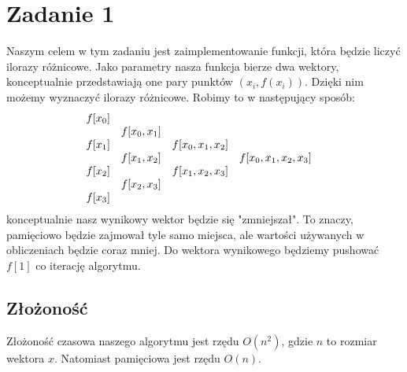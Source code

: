 \documentclass{article}
\begin{document}

\section*{Zadanie 1}
Naszym celem w tym zadaniu jest zaimplementowanie funkcji, która będzie liczyć
ilorazy różnicowe.
Jako parametry nasza funkcja bierze dwa wektory, konceptualnie przedstawiają
one pary punktów $(x_i, f(x_i))$. Dzięki nim możemy wyznaczyć ilorazy różnicowe.
Robimy to w następujący sposób:
\[
\begin{array}[t]{ccccc}
f[x_0] & & & & \\
& f[x_0, x_1] & & & \\
f[x_1] & & f[x_0, x_1, x_2] & & \\
& f[x_1, x_2] & & f[x_0, x_1, x_2, x_3] & \\
f[x_2] & & f[x_1, x_2, x_3] & & \\
& f[x_2, x_3] & & & \\
f[x_3] & & & & \\
\end{array}
\]
konceptualnie nasz wynikowy wektor będzie się "zmniejszał".
To znaczy, pamięciowo będzie zajmował tyle samo miejsca, ale
wartości używanych w obliczeniach będzie coraz mniej. Do wektora
wynikowego będziemy pushować $f[1]$ co iterację algorytmu.
\begin{algorithm}[h]
    \SetAlgoLined
    
\end{algorithm}
\subsection*{Złożoność}
Złożoność czasowa naszego algorytmu jest rzędu $O(n^2)$, gdzie $n$ to rozmiar wektora $x$.
Natomiast pamięciowa jest rzędu $O(n)$.
\end{document}
